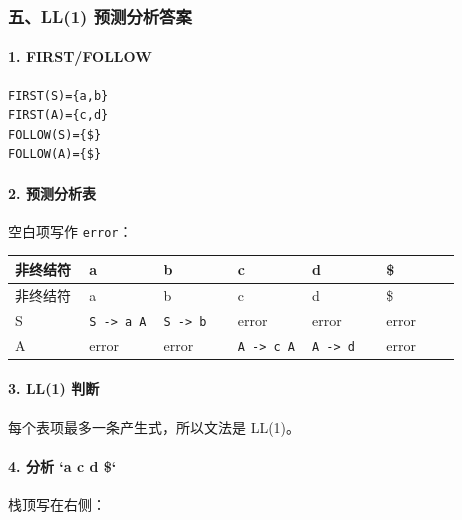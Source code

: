 \documentclass[UTF8]{ctexart}
\begin{document}
\subsubsection*{五、LL(1) 预测分析答案}

\paragraph*{1. FIRST/FOLLOW}

\begin{Verbatim}[fontsize=\small,breaklines=true]
FIRST(S)={a,b}
FIRST(A)={c,d}
FOLLOW(S)={$}
FOLLOW(A)={$}
\end{Verbatim}

\paragraph*{2. 预测分析表}

空白项写作 \texttt{error}：

\begin{longtable}{|p{0.16\linewidth}|p{0.16\linewidth}|p{0.16\linewidth}|p{0.16\linewidth}|p{0.16\linewidth}|p{0.16\linewidth}|}
\hline
非终结符 & a & b & c & d & \$ \\
\hline
\endfirsthead
非终结符 & a & b & c & d & \$ \\
\hline
\endhead
S & \texttt{S -> a A} & \texttt{S -> b} & error & error & error \\
\hline
A & error & error & \texttt{A -> c A} & \texttt{A -> d} & error \\
\hline
\end{longtable}

\paragraph*{3. LL(1) 判断}

每个表项最多一条产生式，所以文法是 LL(1)。

\paragraph*{4. 分析 `a c d \$`}

栈顶写在右侧：
\end{document}
